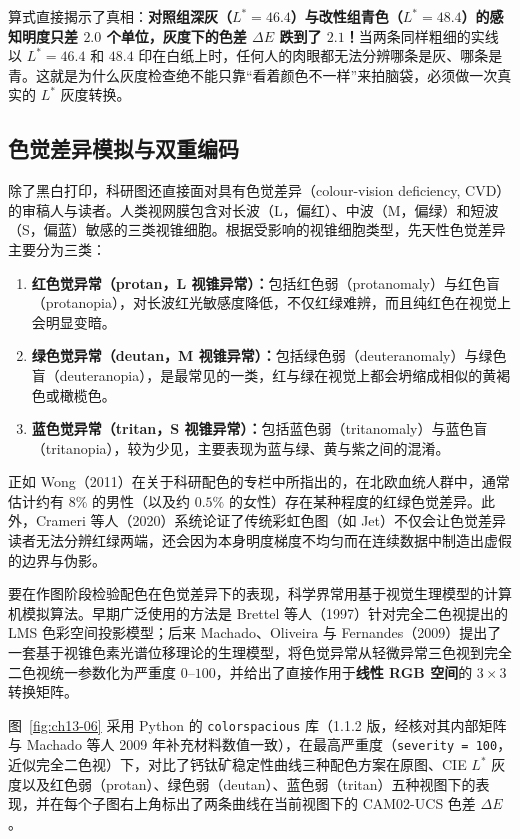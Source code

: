 算式直接揭示了真相：\textbf{对照组深灰（$L^* = 46.4$）与改性组青色（$L^* = 48.4$）的感知明度只差 $2.0$ 个单位，灰度下的色差 $\Delta E$ 跌到了 $2.1$！}当两条同样粗细的实线以 $L^* = 46.4$ 和 $48.4$ 印在白纸上时，任何人的肉眼都无法分辨哪条是灰、哪条是青。这就是为什么灰度检查绝不能只靠“看着颜色不一样”来拍脑袋，必须做一次真实的 $L^*$ 灰度转换。

\subsection*{色觉差异模拟与双重编码}

除了黑白打印，科研图还直接面对具有色觉差异（colour-vision deficiency, CVD）的审稿人与读者。人类视网膜包含对长波（L，偏红）、中波（M，偏绿）和短波（S，偏蓝）敏感的三类视锥细胞。根据受影响的视锥细胞类型，先天性色觉差异主要分为三类：
\begin{enumerate}
\item \textbf{红色觉异常（protan，L 视锥异常）：}包括红色弱（protanomaly）与红色盲（protanopia），对长波红光敏感度降低，不仅红绿难辨，而且纯红色在视觉上会明显变暗。
\item \textbf{绿色觉异常（deutan，M 视锥异常）：}包括绿色弱（deuteranomaly）与绿色盲（deuteranopia），是最常见的一类，红与绿在视觉上都会坍缩成相似的黄褐色或橄榄色。
\item \textbf{蓝色觉异常（tritan，S 视锥异常）：}包括蓝色弱（tritanomaly）与蓝色盲（tritanopia），较为少见，主要表现为蓝与绿、黄与紫之间的混淆。
\end{enumerate}

正如 Wong（2011）在关于科研配色的专栏中所指出的，在北欧血统人群中，通常估计约有 $8\%$ 的男性（以及约 $0.5\%$ 的女性）存在某种程度的红绿色觉差异。此外，Crameri 等人（2020）系统论证了传统彩虹色图（如 Jet）不仅会让色觉差异读者无法分辨红绿两端，还会因为本身明度梯度不均匀而在连续数据中制造出虚假的边界与伪影。

要在作图阶段检验配色在色觉差异下的表现，科学界常用基于视觉生理模型的计算机模拟算法。早期广泛使用的方法是 Brettel 等人（1997）针对完全二色视提出的 LMS 色彩空间投影模型；后来 Machado、Oliveira 与 Fernandes（2009）提出了一套基于视锥色素光谱位移理论的生理模型，将色觉异常从轻微异常三色视到完全二色视统一参数化为严重度 $0\text{--}100$，并给出了直接作用于\textbf{线性 RGB 空间}的 $3 \times 3$ 转换矩阵。

图~\ref{fig:ch13-06} 采用 Python 的 \texttt{colorspacious} 库（1.1.2 版，经核对其内部矩阵与 Machado 等人 2009 年补充材料数值一致），在最高严重度（\texttt{severity = 100}，近似完全二色视）下，对比了钙钛矿稳定性曲线三种配色方案在原图、CIE $L^*$ 灰度以及红色弱（protan）、绿色弱（deutan）、蓝色弱（tritan）五种视图下的表现，并在每个子图右上角标出了两条曲线在当前视图下的 CAM02-UCS 色差 $\Delta E$。


